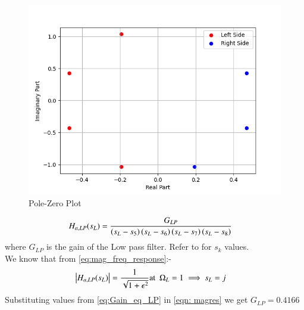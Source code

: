 \documentclass[journal,12pt,twocolumn]{IEEEtran}
\theoremstyle{remark}
\begin{document}
\begin{enumerate}
\begin{figure}[H]
    \centering
    \includegraphics[width = \columnwidth]{figs/sk_pole_zero.png}
    \caption{Pole-Zero Plot}
    \label{fig:pzplot}
\end{figure}
\begin{align}
    H_{a,LP}(s_L) &= \frac{G_{LP}}{\left(s_L-s_5\right)\left(s_L-s_6\right)\left(s_L-s_7\right)\left(s_L-s_8\right)} \label{eqn: magres}
\end{align}
where $G_{LP}$ is the gain of the Low pass filter. Refer to  for $s_k$ values.\\

We know that from \eqref{eq:mag_freq_response}:-
\begin{align}
    \left\vert H_{a,LP}(s_L)\right\vert &= \frac{1}{\sqrt{1+\epsilon^2}} \text{at} \hspace{5pt} \Omega_{L}=1 \implies s_{L} = j \label{eq:Gain_eq_LP} 
\end{align}
Substituting values from \eqref{eq:Gain_eq_LP} in \eqref{eqn: magres} we get $G_{LP}=0.4166$ \\


\end{enumerate}
\end{document}
